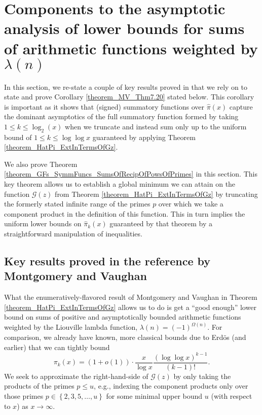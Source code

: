 \documentclass[11pt,reqno,a4letter]{article}
\numberwithin{figure}{section}
\numberwithin{table}{section}
\theoremstyle{plain}
\numberwithin{theorem}{section}
\theoremstyle{definition}
\begin{document}
\newpage 
\section{Components to the asymptotic analysis of lower bounds for 
         sums of arithmetic functions weighted by $\lambda(n)$} 
\label{Section_MVCh7_GzBounds} 

In this section, we re-state a couple of key results proved in \cite[\S 7.4]{MV} that we rely on 
to state and prove Corollary \ref{theorem_MV_Thm7.20} stated below. This corollary is important as it shows 
that (signed) summatory functions over $\widehat{\pi}(x)$ 
capture the dominant asymptotics of the full summatory function formed by taking $1 \leq k \leq \log_2(x)$ when 
we truncate and instead sum only up to the uniform bound of $1 \leq k \leq \log\log x$ guaranteed by applying 
Theorem \ref{theorem_HatPi_ExtInTermsOfGz}. 

We also prove 
Theorem \ref{theorem_GFs_SymmFuncs_SumsOfRecipOfPowsOfPrimes} in this section. 
This key theorem allows us to establish a global minimum we can attain on the function $\mathcal{G}(z)$ from 
Theorem \ref{theorem_HatPi_ExtInTermsOfGz} by truncating the formerly stated infinite 
range of the primes $p$ over which we take a component product in the definition of this function. 
This in turn implies the uniform lower bounds on $\widehat{\pi}_k(x)$ guaranteed by that theorem by 
a straightforward manipulation of inequalities. 

\subsection{Key results proved in the reference by Montgomery and Vaughan} 
\label{subSection_MVPrereqResultStmts} 

What the enumeratively-flavored result of Montgomery and Vaughan 
in Theorem \ref{theorem_HatPi_ExtInTermsOfGz} allows us to do is get a 
``good enough'' lower bound on sums of positive and asymptotically bounded arithmetic functions 
weighted by the Liouville lambda function, $\lambda(n) = (-1)^{\Omega(n)}$. 
For comparison, we already have known, more classical bounds due to Erd\"os (and earlier) that 
we can tightly bound \cite{ERDOS-PRIMEK-FUNC,MV} 
\[
\pi_k(x) = (1 + o(1)) \cdot \frac{x}{\log x} \frac{(\log\log x)^{k-1}}{(k-1)!}. 
\] 
We seek to approximate the right-hand-side of $\mathcal{G}(z)$ by only taking the products of the primes 
$p \leq u$, e.g., indexing the component products only over those primes 
$p \in \left\{2,3,5,\ldots,u\right\}$ for some minimal upper bound $u$ (with respect to $x$) 
as $x \rightarrow \infty$. 
\end{document}
